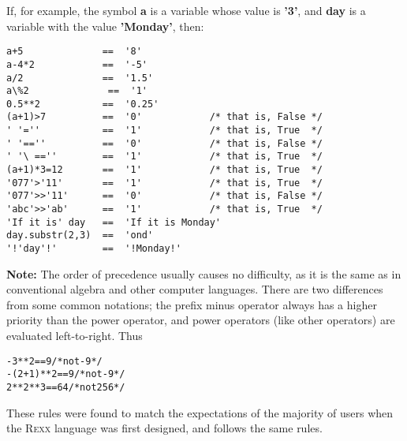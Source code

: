  If, for example, the symbol \textbf{a} is a variable whose value
is \textbf{'3'}, and \textbf{day} is a variable with the
value \textbf{'Monday'}, then:
\begin{lstlisting}
a+5              ==  '8'
a-4*2            ==  '-5'
a/2              ==  '1.5'
a\%2              ==  '1'
0.5**2           ==  '0.25'
(a+1)>7          ==  '0'            /* that is, False */
' '=''           ==  '1'            /* that is, True  */
' '==''          ==  '0'            /* that is, False */
' '\ ==''        ==  '1'            /* that is, True  */
(a+1)*3=12       ==  '1'            /* that is, True  */
'077'>'11'       ==  '1'            /* that is, True  */
'077'>>'11'      ==  '0'            /* that is, False */
'abc'>>'ab'      ==  '1'            /* that is, True  */
'If it is' day   ==  'If it is Monday'
day.substr(2,3)  ==  'ond'
'!'day'!'        ==  '!Monday!'
\end{lstlisting}
\begin{shaded}
\textbf{Note: }The \nr{} order of precedence usually causes no difficulty, as it
is the same as in conventional algebra and other computer languages.
There are two differences from some common notations; the prefix minus
operator always has a higher priority than the power operator, and
power operators (like other operators) are evaluated left-to-right.
Thus
\begin{alltt}
-3**2      ==  9    /* not -9  */
-(2+1)**2  ==  9    /* not -9  */
2**2**3    ==  64   /* not 256 */
\end{alltt}
 \end{shaded}
These rules were found to match the expectations of the majority of
users when the R\textsc{exx} language was first designed, and \nr{} follows the
same rules.

